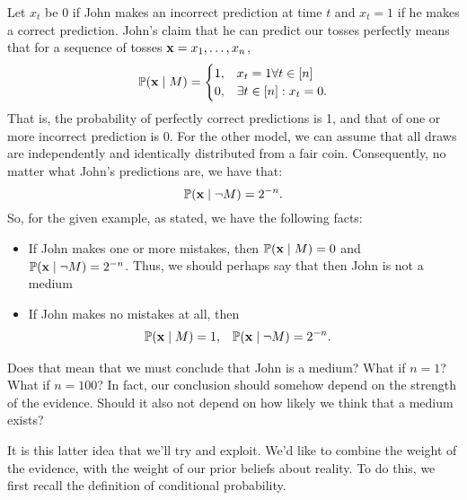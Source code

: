 {  Let $x_t$ be $0$ if John makes an incorrect prediction at time $t$ and $x_t = 1$ if he makes a correct prediction. John's claim that he can predict our tosses perfectly means that for a sequence of tosses ${\mathbf{x}} = x_1, \ldots, x_n$,
  \[
  \mathop{\mbox{\ensuremath{\mathbb{P}}}}\nolimits({\mathbf{x}} \mid M) = \begin{cases}
    1, & x_t = 1 \forall t \in [n]\\
    0, & \exists t \in [n] : x_t = 0.
  \end{cases}
  \]
  That is, the probability of perfectly correct predictions is 1, and that of one or more incorrect prediction is 0. For the other model, we can assume that all draws are independently and identically distributed from a fair coin. Consequently, no matter what John's predictions are, we have that:
  \[
  \mathop{\mbox{\ensuremath{\mathbb{P}}}}\nolimits({\mathbf{x}} \mid \neg M) = 2^{-n}.
  \]
  So, for the given example, as stated, we have the following facts:
  \begin{itemize}
  \item If John makes one or more mistakes, then $\mathop{\mbox{\ensuremath{\mathbb{P}}}}\nolimits({\mathbf{x}} \mid M) = 0$ and $\mathop{\mbox{\ensuremath{\mathbb{P}}}}\nolimits({\mathbf{x}} \mid \neg M) = 2^{-n}$. Thus, we should perhaps say that then John is not a medium
  \item If John makes no mistakes at all, then 
    \begin{align}
      \mathop{\mbox{\ensuremath{\mathbb{P}}}}\nolimits({\mathbf{x}} \mid M) &= 1,
      &
        \mathop{\mbox{\ensuremath{\mathbb{P}}}}\nolimits({\mathbf{x}} \mid \neg M) &= 2^{-n}.
    \end{align}
  \end{itemize}
  Does that mean that we must conclude that John is a medium? What if
  $n = 1$? What if $n=100$?  In fact, our conclusion should somehow
  depend on the strength of the evidence. Should it also not depend on how
  likely we think that a medium exists?

  It is this latter idea that we'll try and exploit. We'd like to combine the weight of the evidence, with the weight of our prior beliefs about reality.
  To do this, we first recall the definition of conditional probability. 
}
